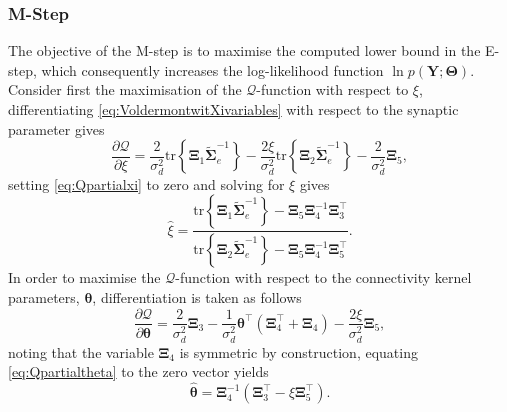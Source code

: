 \documentclass[]{article}
\begin{document}
\subsubsection{M-Step}
The objective of the M-step is to maximise the computed lower bound in the E-step, which consequently increases the log-likelihood function $\ln p(\mathbf Y;\boldsymbol\Theta)$.                                                                                                                                                                                                                                                                                                                                                                                                                                  Consider first the maximisation of the $\mathcal{Q}$-function with respect to $\xi$, differentiating \eqref{eq:VoldermontwitXivariables} with respect to the synaptic parameter gives
\begin{equation}\label{eq:Qpartialxi}
 \frac{\partial \mathcal Q}{\partial\xi}=\frac{2}{\sigma_d^2}\mathrm{tr}\left\lbrace \boldsymbol\Xi_1 \tilde{\boldsymbol\Sigma}_e^{-1}\right\rbrace -\frac{2\xi}{\sigma_d^2}\mathrm{tr}\left\lbrace \boldsymbol\Xi_2 \tilde{\boldsymbol\Sigma}_e^{-1}\right\rbrace-\frac{2}{\sigma_d^2}\boldsymbol\Xi_5,
\end{equation}
setting \eqref{eq:Qpartialxi} to zero and solving for $\xi$ gives
\begin{equation}\label{eq:xihat}
 \hat{\xi}=\frac{\mathrm{tr}\left\lbrace \boldsymbol\Xi_1 \tilde{\boldsymbol\Sigma}_e^{-1}\right\rbrace-\boldsymbol\Xi_5\boldsymbol\Xi_4^{-1}\boldsymbol\Xi_3^\top}{\mathrm{tr}\left\lbrace \boldsymbol\Xi_2 \tilde{\boldsymbol\Sigma}_e^{-1}\right\rbrace-\boldsymbol\Xi_5\boldsymbol\Xi_4^{-1}\boldsymbol\Xi_5^{\top}}.
\end{equation}
In order to maximise the $\mathcal{Q}$-function with respect to the connectivity kernel parameters, $\boldsymbol\theta$, differentiation is taken as follows
\begin{equation}\label{eq:Qpartialtheta}
 \frac{\partial \mathcal Q}{\partial \boldsymbol\theta}=\frac{2}{\sigma_d^2}\boldsymbol\Xi_3-\frac{1}{\sigma_d^2}\boldsymbol\theta^\top(\boldsymbol\Xi_4^\top+\boldsymbol\Xi_4)-\frac{2\xi}{\sigma_d^2}\boldsymbol\Xi_5,
\end{equation}
noting that the variable $\boldsymbol\Xi_4$ is symmetric by construction, equating \eqref{eq:Qpartialtheta} to the zero vector yields
\begin{equation}\label{eq:thetahat}
 \hat{\boldsymbol \theta}=\boldsymbol\Xi_4^{-1}\left(\boldsymbol\Xi_3^\top-\xi\boldsymbol\Xi_5^\top \right).
\end{equation}
\end{document}
